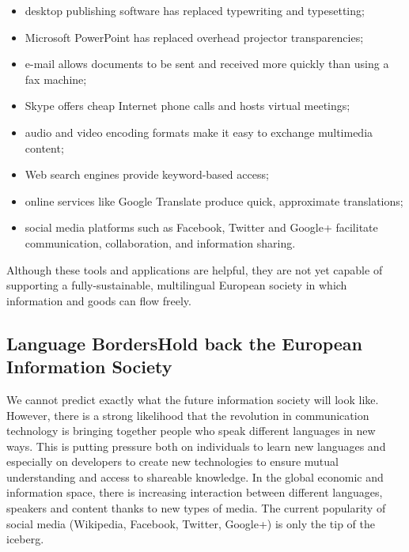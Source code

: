 \begin{multicols}{2}
\begin{itemize}
\item desktop publishing software has replaced typewriting and typesetting;
\item Microsoft PowerPoint has replaced overhead projector transparencies;
\item e-mail allows documents to be sent and received more quickly than using a fax machine;
\item Skype offers cheap Internet phone calls and hosts virtual meetings;
\item audio and video encoding formats make it easy to exchange multimedia content;
\item Web search engines provide keyword-based access;
\item online services like Google Translate produce quick, approximate translations;
\item social media platforms such as Facebook, Twitter and Google+ facilitate communication, collaboration, and information sharing.
\end{itemize}

Although these tools and applications are helpful, they are not yet capable of supporting a fully-sustainable, multilingual European society in which information and goods can flow freely.

\subsection[Language Borders Hold back the European Information Society]{Language Borders\newline Hold back the European Information Society}

We cannot predict exactly what the future information society will look like. However, there is a strong likelihood that the revolution in communication technology is bringing together people who speak different languages in new ways. This is putting pressure both on individuals to learn new languages and especially on developers to create new technologies to ensure mutual understanding and access to shareable knowledge. In the global economic and information space, there is increasing interaction between different languages, speakers and content thanks to new types of media. The current popularity of social media (Wikipedia, Facebook, Twitter, Google+) is only the tip of the iceberg.



\end{multicols}
